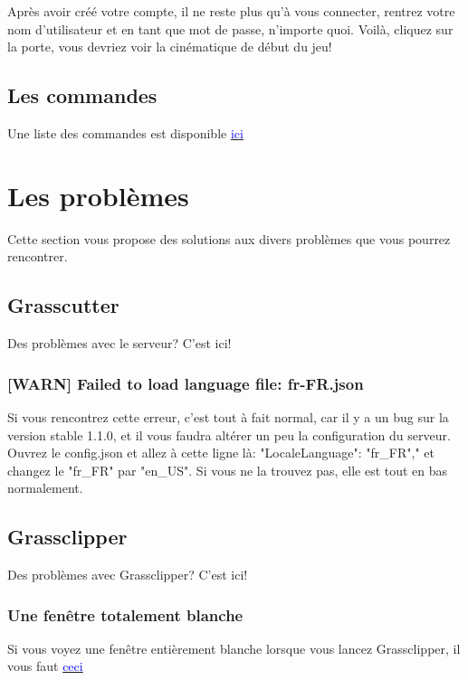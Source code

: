 \documentclass{article}
\begin{document}
Après avoir créé votre compte, il ne reste plus qu'à vous connecter, rentrez votre nom d'utilisateur et en tant que mot de passe, n'importe quoi.\newline
Voilà, cliquez sur la porte, vous devriez voir la cinématique de début du jeu!

\subsection{Les commandes}
Une liste des commandes est disponible \href{https://github.com/Grasscutters/Grasscutter/wiki/Commands}{\textcolor{blue}{ici}}

\section{Les problèmes}
Cette section vous propose des solutions aux divers problèmes que vous pourrez rencontrer.

\subsection{Grasscutter}
Des problèmes avec le serveur? C'est ici!

\subsubsection{[WARN] Failed to load language file: fr-FR.json}
Si vous rencontrez cette erreur, c'est tout à fait normal, car il y a un bug sur la version stable 1.1.0, et il vous faudra altérer un peu la configuration du serveur.\newline
Ouvrez le config.json et allez à cette ligne là: "LocaleLanguage": "fr\_FR"," et changez le "fr\_FR" par "en\_US".\newline
Si vous ne la trouvez pas, elle est tout en bas normalement.

\subsection{Grassclipper}
Des problèmes avec Grassclipper? C'est ici!

\subsubsection{Une fenêtre totalement blanche}
Si vous voyez une fenêtre entièrement blanche lorsque vous lancez Grassclipper, il vous faut \href{https://developer.microsoft.com/en-us/microsoft-edge/webview2/#download}{\textcolor{blue}{ceci}}
\end{document}
